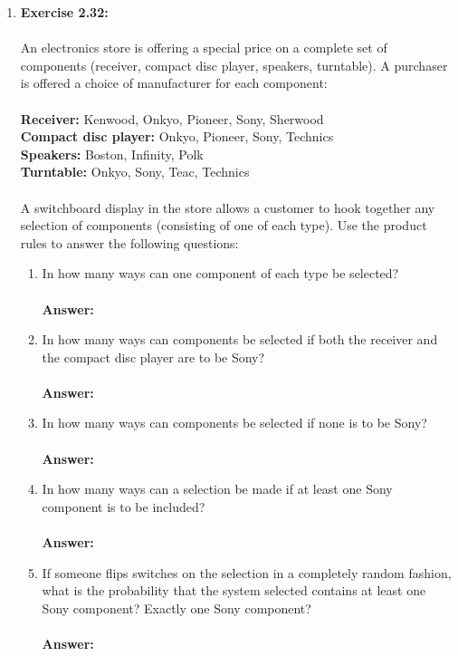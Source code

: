 \documentclass[12pt]{article}
\theoremstyle{homework}
\begin{document}
\begin{enumerate}
\vspace{1in}


\item\hspace{.5in}\textbf{Exercise 2.32:}\\
\\
An electronics store is offering a special price on a complete set of components (receiver, compact disc player, speakers, turntable). A purchaser is offered a choice of manufacturer for each component:\\
\\
\textbf{Receiver:} Kenwood, Onkyo, Pioneer, Sony, Sherwood \\
\textbf{Compact disc player:} Onkyo, Pioneer, Sony, Technics\\
\textbf{Speakers:} Boston, Infinity, Polk\\
\textbf{Turntable:} Onkyo, Sony, Teac, Technics\\
\\
A switchboard display in the store allows a customer to hook together any selection of components (consisting of one of each type). Use the product rules to answer the following questions:
\begin{enumerate}
\item In how many ways can one component of each type be selected?\\
\\
 \textbf{Answer:}
 \\
\item In how many ways can components be selected if both the receiver and the compact disc player are to be Sony?\\
\\
 \textbf{Answer:}
 \\
\item In how many ways can components be selected if none is to be Sony?\\
\\
 \textbf{Answer:}
 \\
\item In how many ways can a selection be made if at least one Sony component is to be included?\\
\\
 \textbf{Answer:}
 \\
\item If someone flips switches on the selection in a completely random fashion, what is the probability that the system selected contains at least one Sony component? Exactly one Sony component?\\
\\
 \textbf{Answer:}
 \\
\end{enumerate}
\vspace{1in}



\end{enumerate}
\end{document}
